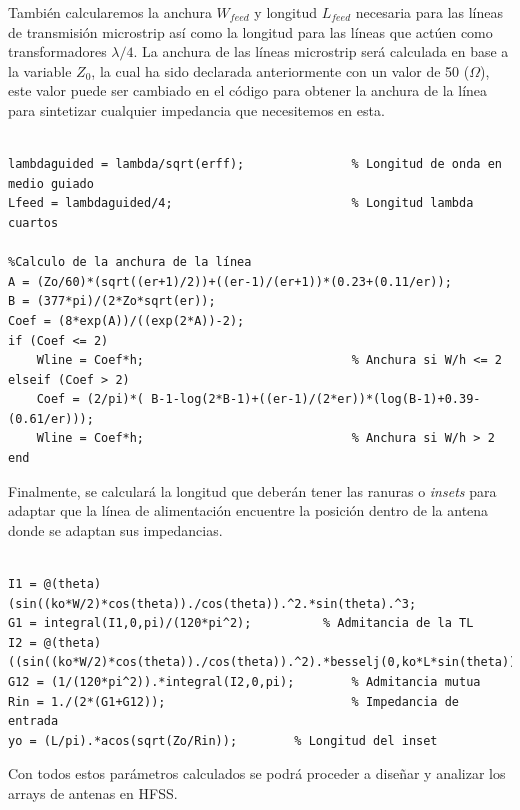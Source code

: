 \par También calcularemos la anchura $W_{feed}$ y longitud $L_{feed}$ necesaria para las líneas de transmisión microstrip así como la longitud para las líneas que actúen como transformadores $\lambda /4$. La anchura de las líneas microstrip será calculada en base a la variable $Z_{0}$, la cual ha sido declarada anteriormente con un valor de 50 ($\Omega$), este valor puede ser cambiado en el código para obtener la anchura de la línea para sintetizar cualquier impedancia que necesitemos en esta.

\begin{lstlisting}[style=Matlab-color, caption={Parámetros de diseño de la línea de alimentación},label=alimentacion]
%% Cálculos de línea de alimentación

lambdaguided = lambda/sqrt(erff);               % Longitud de onda en medio guiado
Lfeed = lambdaguided/4;                         % Longitud lambda cuartos

%Calculo de la anchura de la línea
A = (Zo/60)*(sqrt((er+1)/2))+((er-1)/(er+1))*(0.23+(0.11/er)); 
B = (377*pi)/(2*Zo*sqrt(er));
Coef = (8*exp(A))/((exp(2*A))-2);
if (Coef <= 2)
	Wline = Coef*h;                             % Anchura si W/h <= 2
elseif (Coef > 2)
    Coef = (2/pi)*( B-1-log(2*B-1)+((er-1)/(2*er))*(log(B-1)+0.39-(0.61/er)));
	Wline = Coef*h;                             % Anchura si W/h > 2
end
\end{lstlisting}

\par Finalmente, se calculará la longitud que deberán tener las ranuras o \textit{insets} para adaptar que la línea de alimentación encuentre la posición dentro de la antena donde se adaptan sus impedancias.

\begin{lstlisting}[style=Matlab-color, caption={Parámetros de diseño del \textit{inset}},label=inset]
%% Inset

I1 = @(theta) (sin((ko*W/2)*cos(theta))./cos(theta)).^2.*sin(theta).^3;
G1 = integral(I1,0,pi)/(120*pi^2);          % Admitancia de la TL
I2 = @(theta) ((sin((ko*W/2)*cos(theta))./cos(theta)).^2).*besselj(0,ko*L*sin(theta)).*sin(theta).^3;
G12 = (1/(120*pi^2)).*integral(I2,0,pi);        % Admitancia mutua
Rin = 1./(2*(G1+G12));                          % Impedancia de entrada
yo = (L/pi).*acos(sqrt(Zo/Rin));        % Longitud del inset
\end{lstlisting}

\par Con todos estos parámetros calculados se podrá proceder a diseñar y analizar los arrays de antenas en HFSS.

